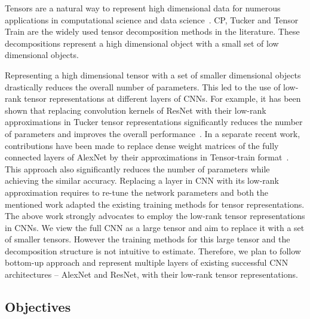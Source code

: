 Tensors are a natural way to represent high dimensional data for numerous applications in computational science and data science~\cite{KB-SIAMReview2009}. 
CP, Tucker and Tensor Train are the widely used tensor decomposition methods in the literature. These decompositions represent a high dimensional object with a small set of low dimensional objects.



Representing a high dimensional tensor with a set of smaller dimensional objects drastically reduces the overall number of parameters. This led to the use of low-rank tensor representations at different layers of CNNs. For example, it has been shown that replacing convolution kernels of ResNet with their low-rank approximations in Tucker tensor representations significantly reduces the number of parameters and improves the overall performance~\cite{PSSEG+-ECCV2020}. In a separate recent work, contributions have been made to replace dense weight matrices of the fully connected layers of AlexNet by their approximations in Tensor-train format~\cite{NPOV-NIPS2015}. This approach also significantly reduces the number of parameters while achieving the similar accuracy. Replacing a layer in CNN with its low-rank approximation requires to re-tune the network parameters and both the mentioned work adapted the existing training methods for tensor representations. The above work strongly advocates to employ the low-rank tensor representations in CNNs. We view the full CNN as a large tensor and aim to replace it with a set of smaller tensors. However the training methods for this large tensor and the decomposition structure is not intuitive to estimate. Therefore, we plan to follow bottom-up approach and represent multiple layers of existing successful CNN architectures -- AlexNet and ResNet, with their low-rank tensor representations.



\subsection*{Objectives}

